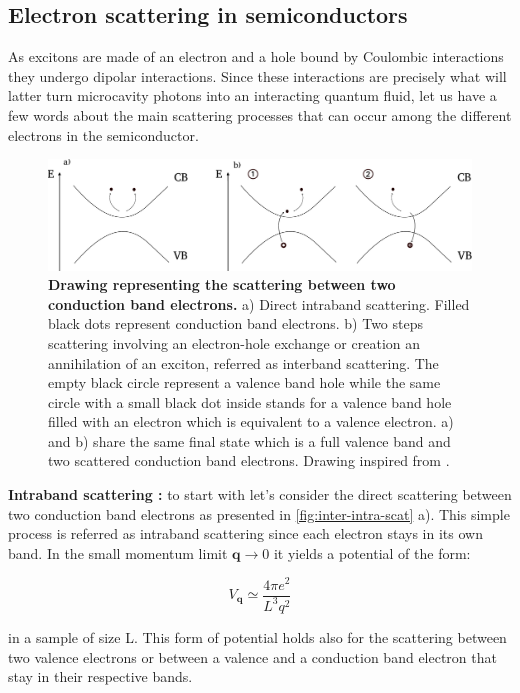 \subsection{Electron scattering in semiconductors}
As excitons are made of an electron and a hole bound by Coulombic interactions they undergo dipolar interactions.
 Since these interactions are precisely what will latter turn microcavity photons into an interacting quantum fluid, let us have a few words about the main scattering processes that can occur among the different electrons in the semiconductor. 
\bigskip

\begin{figure}[h]
    \centering
    \includegraphics[width=1\linewidth]{chap1/fig/intra-inter-band-processes.pdf}
    \caption{\textbf{Drawing representing the scattering between two conduction band electrons.} a) Direct intraband scattering. Filled black dots represent conduction band electrons. b) Two steps scattering involving an electron-hole exchange or creation an annihilation of an exciton, referred as interband scattering.
    The empty black circle represent a valence band hole while the same circle with a small black dot inside stands for a valence band hole filled with an electron which is equivalent to a valence electron. a) and b) share the same
     final state which is a full valence band and two scattered conduction band electrons. Drawing inspired from \cite{Combescot_cooper_excitons_2015}.}
    \label{fig:inter-intra-scat}
\end{figure}


\textbf{Intraband scattering :}
to start with let's consider the direct scattering between two conduction band electrons as presented in \autoref{fig:inter-intra-scat} a). This simple process is referred as intraband scattering since each electron stays in its own band. In the small momentum limit $\mathrm{\textbf{q}}\to 0$ it yields a potential of the form:

\begin{equation}
    V_{\textbf{q}} \simeq \dfrac{4\pi e^2}{L^3 q^2}
\end{equation}
 
\noindent in a sample of size L. This form of potential holds also for the scattering between two valence electrons or between a valence and a conduction band electron that stay in their respective bands.

